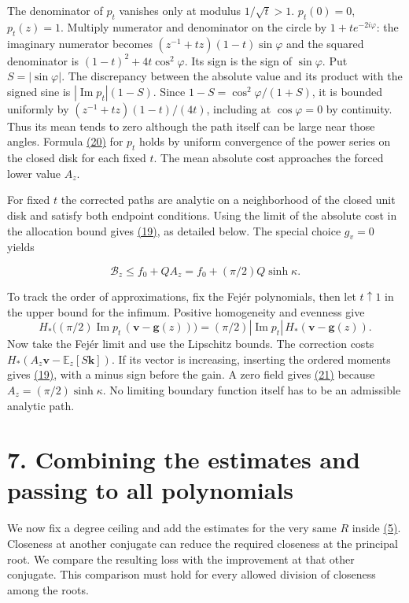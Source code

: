\documentclass[11pt,a4paper]{article}
\begin{document}
The denominator of \(p_t\) vanishes only at modulus \(1/\sqrt t>1\). \(p_t(0)=0\), \(p_t(z)=1\). Multiply numerator and denominator on the circle by \(1+te^{-2i\varphi}\): the imaginary numerator becomes \((z^{-1}+tz)(1-t)\sin\varphi\) and the squared denominator is \((1-t)^2+4t\cos^2\varphi\). Its sign is the sign of \(\sin\varphi\). Put \(S=|\sin\varphi|\). The discrepancy between the absolute value and its product with the signed sine is \(|\operatorname{Im}p_t|(1-S)\). Since \(1-S=\cos^2\varphi/(1+S)\), it is bounded uniformly by \((z^{-1}+tz)(1-t)/(4t)\), including at \(\cos\varphi=0\) by continuity. Thus its mean tends to zero although the path itself can be large near those angles. Formula \hyperref[eq:20]{(20)} for \(p_t\) holds by uniform convergence of the power series on the closed disk for each fixed \(t\). The mean absolute cost approaches the forced lower value \(A_z\).

For fixed \(t\) the corrected paths are analytic on a neighborhood of the closed unit disk and satisfy both endpoint conditions. Using the limit of the absolute cost in the allocation bound gives \hyperref[eq:19]{(19)}, as detailed below. The special choice \(g_v=0\) yields

\[
 \mathcal B_z\le f_0+QA_z=f_0+(\pi/2)Q\sinh\kappa.                       \tag{21}\label{eq:21}
\]

To track the order of approximations, fix the Fejér polynomials, then let \(t\uparrow1\) in the upper bound for the infimum. Positive homogeneity and evenness give \[
 H_*\big((\pi/2)\operatorname{Im}p_t\,(\mathbf v-\mathbf g(z))\big)
 =(\pi/2)|\operatorname{Im}p_t|\, H_*(\mathbf v-\mathbf g(z)).
\] Now take the Fejér limit and use the Lipschitz bounds. The correction costs \(H_*(A_z\mathbf v-\mathbb E_z[S\mathbf k])\). If its vector is increasing, inserting the ordered moments gives \hyperref[eq:19]{(19)}, with a minus sign before the gain. A zero field gives \hyperref[eq:21]{(21)} because \(A_z=(\pi/2)\sinh\kappa\). No limiting boundary function itself has to be an admissible analytic path.

\section{7. Combining the estimates and passing to all polynomials}\label{combining-the-estimates-and-passing-to-all-polynomials}

We now fix a degree ceiling and add the estimates for the very same \(R\) inside \hyperref[eq:5]{(5)}. Closeness at another conjugate can reduce the required closeness at the principal root. We compare the resulting loss with the improvement at that other conjugate. This comparison must hold for every allowed division of closeness among the roots.
\end{document}
